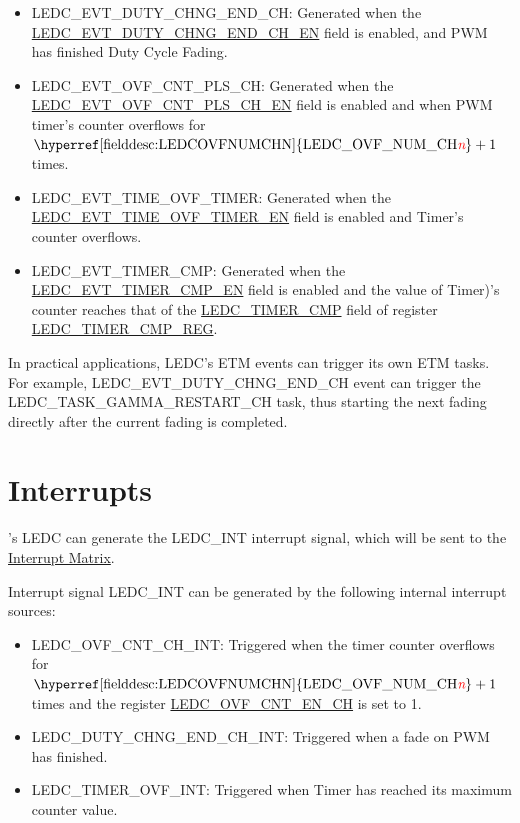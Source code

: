 \documentclass[main\_\_EN.tex]{subfiles}
\begin{document}
\begin{itemize}
    \item LEDC\_EVT\_DUTY\_CHNG\_END\_CH: Generated when the  \hyperref[fielddesc:LEDCEVTDUTYCHNGENDCHNEN]{LEDC\_EVT\_DUTY\_CHNG\_END\_CH\_EN} field is enabled, and PWM has finished Duty Cycle Fading.
    \item LEDC\_EVT\_OVF\_CNT\_PLS\_CH: Generated when the  \hyperref[fielddesc:LEDCEVTOVFCNTPLSCHNEN]{LEDC\_EVT\_OVF\_CNT\_PLS\_CH\_EN} field is enabled and when PWM timer's counter overflows for $ \textrm{\hyperref[fielddesc:LEDCOVFNUMCHN]{LEDC\_OVF\_NUM\_CH\regindex{n}}} + 1 $ times.
    \item LEDC\_EVT\_TIME\_OVF\_TIMER: Generated when the \hyperref[fielddesc:LEDCEVTTIMEOVFTIMERNEN]{LEDC\_EVT\_TIME\_OVF\_TIMER\_EN} field is enabled and Timer's counter overflows.
    \item LEDC\_EVT\_TIMER\_CMP: Generated when the \hyperref[fielddesc:LEDCEVTTIMERNCMPEN]{LEDC\_EVT\_TIMER\_CMP\_EN} field is enabled and the value of Timer)'s counter reaches that of the \hyperref[fielddesc:LEDCTIMERNCMP]{LEDC\_TIMER\_CMP} field of register \hyperref[regdesc:LEDCTIMERNCMPREG]{LEDC\_TIMER\_CMP\_REG}.
\end{itemize}

In practical applications, LEDC's ETM events can trigger its own ETM tasks. For example, LEDC\_EVT\_DUTY\_CHNG\_END\_CH event can trigger the LEDC\_TASK\_GAMMA\_RESTART\_CH task, thus starting the next fading directly after the current fading is completed.

\section{Interrupts}

\chipname{}'s LEDC can generate the LEDC\_INT interrupt signal, which will be sent to the \hyperref[mod:intmtrx]{Interrupt Matrix}.

Interrupt signal LEDC\_INT can be generated by the following internal interrupt sources:

\begin{itemize}
\item \label{int:ledc-ovf-cnt}LEDC\_OVF\_CNT\_CH\_INT: Triggered when the timer counter overflows for $ \textrm{\hyperref[fielddesc:LEDCOVFNUMCHN]{LEDC\_OVF\_NUM\_CH\regindex{n}}} + 1 $ times and the register \hyperref[fielddesc:LEDCOVFCNTENCHN]{LEDC\_OVF\_CNT\_EN\_CH} is set to 1.
\item \label{int:ledc-duty-chng-end}LEDC\_DUTY\_CHNG\_END\_CH\_INT: Triggered when a fade on PWM  has finished.
\item \label{int:ledc-timer-ovf}LEDC\_TIMER\_OVF\_INT: Triggered when Timer has reached its maximum counter value.
\end{itemize}
\end{document}
